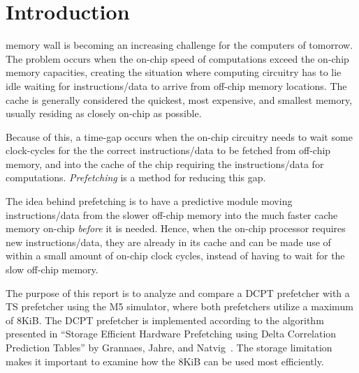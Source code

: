 \section{Introduction}

 memory wall is becoming an increasing challenge for the
computers of tomorrow. The problem occurs when the on-chip speed of computations
exceed the on-chip memory capacities, creating the situation where computing
circuitry has to lie idle waiting for instructions/data to arrive from off-chip
memory locations. The cache is generally considered the quickest, most
expensive, and smallest memory, usually residing as closely on-chip as possible.

Because of this, a time-gap occurs when the on-chip circuitry needs to wait some
clock-cycles for the the correct instructions/data to be fetched from off-chip
memory, and into the cache of the chip requiring the instructions/data for
computations. \emph{Prefetching} is a method for reducing this gap.

The idea behind prefetching is to have a predictive module moving
instructions/data from the slower off-chip memory into the much faster cache
memory on-chip \emph{before} it is needed. Hence, when the on-chip processor
requires new instructions/data, they are already in its cache and can be made
use of within a small amount of on-chip clock cycles, instead of having to wait
for the slow off-chip memory.

The purpose of this report is to analyze and compare a DCPT prefetcher with a TS
prefetcher using the M5 simulator, where both prefetchers utilize a maximum of
8KiB. The DCPT prefetcher is implemented according to the algorithm presented in
``Storage Efficient Hardware Prefetching using Delta Correlation Prediction
Tables'' by Grannaes, Jahre, and Natvig~\cite{dcpt}. The storage limitation
makes it important to examine how the 8KiB can be used most efficiently.


